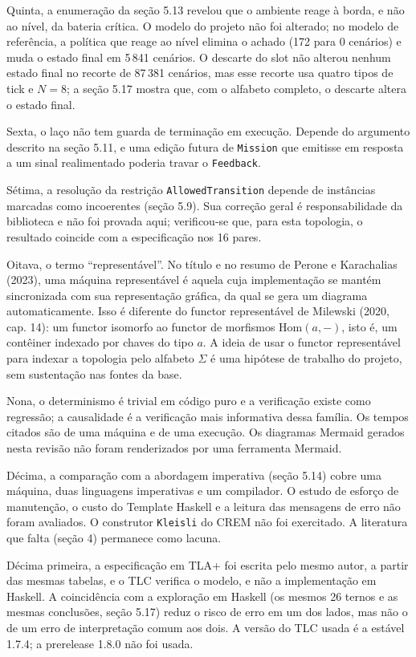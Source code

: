 \documentclass[12pt,a4paper]{article}
\begin{document}
Quinta, a enumeração da seção 5.13 revelou que o ambiente reage à borda, e não ao nível, da bateria crítica. O modelo do projeto não foi alterado; no modelo de referência, a política que reage ao nível elimina o achado (172 para 0 cenários) e muda o estado final em 5\,841 cenários. O descarte do slot não alterou nenhum estado final no recorte de 87\,381 cenários, mas esse recorte usa quatro tipos de tick e $N = 8$; a seção 5.17 mostra que, com o alfabeto completo, o descarte altera o estado final.

Sexta, o laço não tem guarda de terminação em execução. Depende do argumento descrito na seção 5.11, e uma edição futura de \texttt{Mission} que emitisse em resposta a um sinal realimentado poderia travar o \texttt{Feedback}.

Sétima, a resolução da restrição \texttt{AllowedTransition} depende de instâncias marcadas como incoerentes (seção 5.9). Sua correção geral é responsabilidade da biblioteca e não foi provada aqui; verificou-se que, para esta topologia, o resultado coincide com a especificação nos 16 pares.

Oitava, o termo ``representável''. No título e no resumo de Perone e Karachalias (2023), uma máquina representável é aquela cuja implementação se mantém sincronizada com sua representação gráfica, da qual se gera um diagrama automaticamente. Isso é diferente do functor representável de Milewski (2020, cap. 14): um functor isomorfo ao functor de morfismos $\mathrm{Hom}(a, -)$, isto é, um contêiner indexado por chaves do tipo $a$. A ideia de usar o functor representável para indexar a topologia pelo alfabeto $\Sigma$ é uma hipótese de trabalho do projeto, sem sustentação nas fontes da base.

Nona, o determinismo é trivial em código puro e a verificação existe como regressão; a causalidade é a verificação mais informativa dessa família. Os tempos citados são de uma máquina e de uma execução. Os diagramas Mermaid gerados nesta revisão não foram renderizados por uma ferramenta Mermaid.

Décima, a comparação com a abordagem imperativa (seção 5.14) cobre uma máquina, duas linguagens imperativas e um compilador. O estudo de esforço de manutenção, o custo do Template Haskell e a leitura das mensagens de erro não foram avaliados. O construtor \texttt{Kleisli} do CREM não foi exercitado. A literatura que falta (seção 4) permanece como lacuna.

Décima primeira, a especificação em TLA+ foi escrita pelo mesmo autor, a partir das mesmas tabelas, e o TLC verifica o modelo, e não a implementação em Haskell. A coincidência com a exploração em Haskell (os mesmos 26 ternos e as mesmas conclusões, seção 5.17) reduz o risco de erro em um dos lados, mas não o de um erro de interpretação comum aos dois. A versão do TLC usada é a estável 1.7.4; a prerelease 1.8.0 não foi usada.
\end{document}

